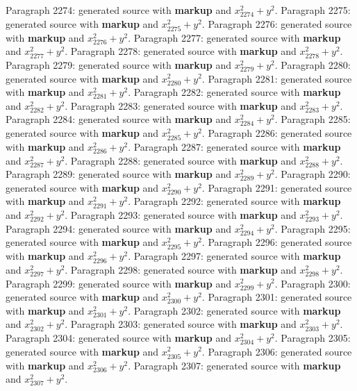 \documentclass{article}
\begin{document}
Paragraph 2274: generated source with \textbf{markup} and $x_{2274}^2 + y^2$.
Paragraph 2275: generated source with \textbf{markup} and $x_{2275}^2 + y^2$.
Paragraph 2276: generated source with \textbf{markup} and $x_{2276}^2 + y^2$.
Paragraph 2277: generated source with \textbf{markup} and $x_{2277}^2 + y^2$.
Paragraph 2278: generated source with \textbf{markup} and $x_{2278}^2 + y^2$.
Paragraph 2279: generated source with \textbf{markup} and $x_{2279}^2 + y^2$.
Paragraph 2280: generated source with \textbf{markup} and $x_{2280}^2 + y^2$.
Paragraph 2281: generated source with \textbf{markup} and $x_{2281}^2 + y^2$.
Paragraph 2282: generated source with \textbf{markup} and $x_{2282}^2 + y^2$.
Paragraph 2283: generated source with \textbf{markup} and $x_{2283}^2 + y^2$.
Paragraph 2284: generated source with \textbf{markup} and $x_{2284}^2 + y^2$.
Paragraph 2285: generated source with \textbf{markup} and $x_{2285}^2 + y^2$.
Paragraph 2286: generated source with \textbf{markup} and $x_{2286}^2 + y^2$.
Paragraph 2287: generated source with \textbf{markup} and $x_{2287}^2 + y^2$.
Paragraph 2288: generated source with \textbf{markup} and $x_{2288}^2 + y^2$.
Paragraph 2289: generated source with \textbf{markup} and $x_{2289}^2 + y^2$.
Paragraph 2290: generated source with \textbf{markup} and $x_{2290}^2 + y^2$.
Paragraph 2291: generated source with \textbf{markup} and $x_{2291}^2 + y^2$.
Paragraph 2292: generated source with \textbf{markup} and $x_{2292}^2 + y^2$.
Paragraph 2293: generated source with \textbf{markup} and $x_{2293}^2 + y^2$.
Paragraph 2294: generated source with \textbf{markup} and $x_{2294}^2 + y^2$.
Paragraph 2295: generated source with \textbf{markup} and $x_{2295}^2 + y^2$.
Paragraph 2296: generated source with \textbf{markup} and $x_{2296}^2 + y^2$.
Paragraph 2297: generated source with \textbf{markup} and $x_{2297}^2 + y^2$.
Paragraph 2298: generated source with \textbf{markup} and $x_{2298}^2 + y^2$.
Paragraph 2299: generated source with \textbf{markup} and $x_{2299}^2 + y^2$.
Paragraph 2300: generated source with \textbf{markup} and $x_{2300}^2 + y^2$.
Paragraph 2301: generated source with \textbf{markup} and $x_{2301}^2 + y^2$.
Paragraph 2302: generated source with \textbf{markup} and $x_{2302}^2 + y^2$.
Paragraph 2303: generated source with \textbf{markup} and $x_{2303}^2 + y^2$.
Paragraph 2304: generated source with \textbf{markup} and $x_{2304}^2 + y^2$.
Paragraph 2305: generated source with \textbf{markup} and $x_{2305}^2 + y^2$.
Paragraph 2306: generated source with \textbf{markup} and $x_{2306}^2 + y^2$.
Paragraph 2307: generated source with \textbf{markup} and $x_{2307}^2 + y^2$.
\end{document}
